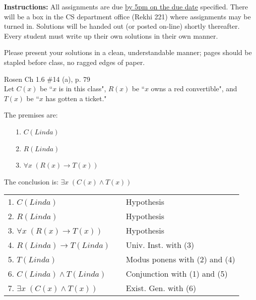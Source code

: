 \documentclass[11pt,addpoints]{exam}
\newcommand{\ra}{\rightarrow}
\begin{document}
\extrawidth{0.5in} \extrafootheight{-0in} \pagestyle{headandfoot}
\headrule {} \footrule {}


\noindent \textbf{Instructions:} All assignments are due \underline{by 5pm on the due date} specified.  There will be a box in the CS department office (Rekhi 221) where assignments may be turned in.  Solutions will be handed out (or posted on-line) shortly thereafter.  Every student
must write up their own solutions in their own manner.

\smallskip
\noindent Please present your solutions in a clean, understandable
manner; pages should be stapled before class, no ragged edges of
paper.


\begin{questions}
\printanswers

\question[8] \label{prob1} Rosen Ch 1.6 \#14 (a), p. 79 \\
	Let $C(x)$ be ``$x$ is in this class", $R(x)$ be ``$x$ owns a red convertible", and $T(x)$ be ``$x$ has gotten a ticket."
	\ifprintanswers
        \vspace{-15pt}
   	\fi
\begin{solution}
	The premises are:
    \begin{itemize}[itemsep=0pt,parsep=0pt,topsep=0pt,partopsep=0pt]
        \item[1.] $C(Linda)$
        \item[2.] $R(Linda)$
        \item[3.] $\forall x\; (R(x) \ra T(x))$
    \end{itemize}
    The conclusion is: $\exists x\; (C(x) \wedge T(x))$

    \smallskip
    \begin{tabular}{lll}
    	1. $C(Linda)$		&	& Hypothesis \\
    	2. $R(Linda)$		&	& Hypothesis \\
    	3. $\forall x\; (R(x) \ra T(x))$	& & Hypothesis \\
    	4. $R(Linda) \ra T(Linda)$			& & Univ. Inst. with (3) \\
    	5. $T(Linda)$		& 	& Modus ponens with (2) and (4) \\
    	6. $C(Linda) \wedge T(Linda)$		& & Conjunction with (1) and (5) \\
    	7. $\exists x\; (C(x) \wedge T(x))$	& & Exist. Gen. with (6) 
    \end{tabular}
\end{solution}



\end{questions}
\end{document}
